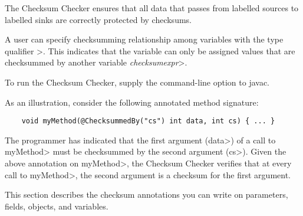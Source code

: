 \htmlhr
{}

The Checksum Checker ensures that all data that passes from labelled sources
to labelled sinks are correctly protected by checksums.

A user can specify checksumming relationship among
variables with the type qualifier
\<>.
This indicates that the variable can only be assigned values that are
checksummed by another variable \<\small\emph{checksumexpr}>.

To run the Checksum Checker, supply the
command-line option to javac.

As an illustration, consider the following annotated method signature:
\begin{Verbatim}
    void myMethod(@ChecksummedBy("cs") int data, int cs) { ... }
\end{Verbatim}
The programmer has indicated that the first argument (\<data>) of a call to
\<myMethod> must be checksummed by the second argument (\<cs>).
Given the above annotation on \<myMethod>, the Checksum Checker verifies that at
every call to \<myMethod>, the second argument is a checksum for the first argument.



This section describes the checksum annotations you can write on parameters, fields, objects, and variables.


